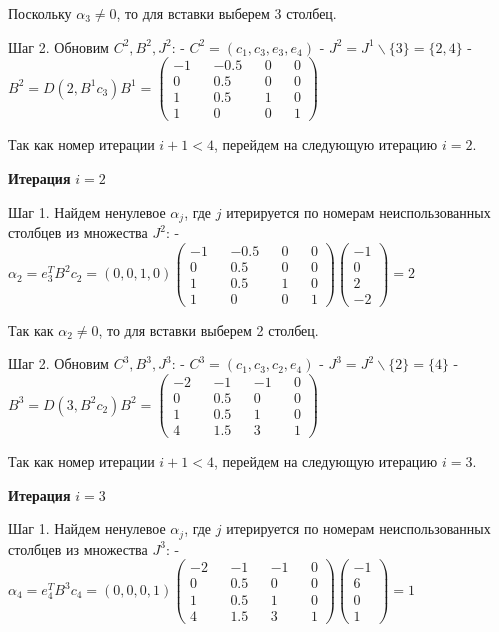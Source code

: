 \documentclass[11pt]{article}
\begin{document}
Поскольку \(\alpha_3 \ne 0\), то для вставки выберем 3 столбец.

Шаг 2. Обновим \(C^2, B^2, J^2\): - \(C^2 = (c_1, c_3, e_3, e_4)\) -
\(J^2 = J^1 \backslash \{3\} = \{2, 4 \}\) -
\(B^2 = D(2, B^1c_3)B^1 = \begin{pmatrix} -1 && -0.5 && 0 && 0 \\ 0 && 0.5 && 0 && 0 \\ 1 && 0.5 && 1 && 0 \\ 1 && 0 && 0 && 1 \end{pmatrix}\)

Так как номер итерации \(i + 1 < 4\), перейдем на следующую итерацию
\(i = 2\).

\textbf{Итерация} \(i = 2\)

Шаг 1. Найдем ненулевое \(\alpha_j\), где \(j\) итерируется по номерам
неиспользованных столбцев из множества \(J^2\): -
\(\alpha_2 = e_3^TB^2c_2 = (0, 0, 1, 0) \begin{pmatrix} -1 && -0.5 && 0 && 0 \\ 0 && 0.5 && 0 && 0 \\ 1 && 0.5 && 1 && 0 \\ 1 && 0 && 0 && 1 \end{pmatrix} \begin{pmatrix}-1 \\ 0 \\ 2 \\ -2\end{pmatrix} = 2\)

Так как \(\alpha_2 \ne 0\), то для вставки выберем 2 столбец.

Шаг 2. Обновим \(C^3, B^3, J^3\): - \(C^3 = (c_1, c_3, c_2, e_4)\) -
\(J^3 = J^2 \backslash \{2\} = \{4 \}\) -
\(B^3 = D(3, B^2c_2)B^2 = \begin{pmatrix} -2 && -1 && -1 && 0 \\ 0 && 0.5 && 0 && 0 \\ 1 && 0.5 && 1 && 0 \\ 4 && 1.5 && 3 && 1 \end{pmatrix}\)

Так как номер итерации \(i + 1 < 4\), перейдем на следующую итерацию
\(i = 3\).

\textbf{Итерация} \(i = 3\)

Шаг 1. Найдем ненулевое \(\alpha_j\), где \(j\) итерируется по номерам
неиспользованных столбцев из множества \(J^3\): -
\(\alpha_4 = e_4^TB^3c_4 = (0, 0, 0, 1) \begin{pmatrix} -2 && -1 && -1 && 0 \\ 0 && 0.5 && 0 && 0 \\ 1 && 0.5 && 1 && 0 \\ 4 && 1.5 && 3 && 1 \end{pmatrix} \begin{pmatrix}-1 \\ 6 \\ 0 \\ 1\end{pmatrix} = 1\)
\end{document}
